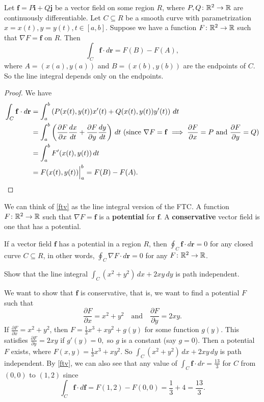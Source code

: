 \begin{theorem}\label{ftv}
    Let $\mathbf f=P\mathbf i+Q\mathbf j$ be a vector field on some region $R$, where $P,Q \colon \mathbb{R}^2 \to \mathbb{R}$ are continuously differentiable. Let $C\subseteq R$ be a smooth curve with parametrization $x=x(t),y=y(t),t\in [a,b]$. Suppose we have a function $F \colon \mathbb{R}^2 \to \mathbb{R}$ such that $\nabla F=\mathbf f$ on $R$. Then \[
        \int_{C}^{} \mathbf f \cdot d\mathbf r=F(B)-F(A),
    \] where $A=(x(a),y(a))$ and $B=(x(b),y(b))$ are the endpoints of $C$. So the line integral depends only on the endpoints.
\end{theorem}
\begin{proof}
We have 
\begin{align*}
    \int_{C}^{} \mathbf f\cdot d\mathbf r&=\int_{a}^{b} \left( P(x(t),y(t))x'(t)+Q(x(t),y(t))y'(t) \right)  \, dt\\
                                         &=\int_{a}^{b} \left( \frac{\partial F}{\partial x}\frac{dx}{dt}+\frac{\partial F}{\partial y}\frac{dy}{dt} \right)  \, dt \ \text{(since} \ \nabla F=\mathbf f \implies \frac{\partial F}{\partial x}=P \ \text{and} \ \frac{\partial F}{\partial y}=Q\text{)}\\
                                         &=\int_{a}^{b} F'(x(t),y(t)) \, dt\\
                                         &=\Big. F(x(t),y(t)) \Big|_a^b=F(B)-F(A).\qedhere
\end{align*}
\end{proof}
We can think of \cref{ftv} as the line integral version of the FTC. A function $F \colon \mathbb{R}^2 \to \mathbb{R}$ such that $\nabla F= \mathbf f$ is a \textbf{potential} for $\mathbf f$. A \textbf{conservative} vector field is one that has a potential.
\begin{cor}
    If a vector field $\mathbf f$ has a potential in a region $R$, then $\oint_{C}^{}  \mathbf f\cdot d\mathbf r=0$ for any closed curve $C\subseteq R$, in other words, $\oint_{C}^{} \nabla F  \cdot  d\mathbf r=0$ for any $F \colon \mathbb{R}^2 \to \mathbb{R}$.
\end{cor}
\begin{example}
    Show that the line integral $\int_{C}^{} (x^2+y^2) \, dx+2xy \, dy$ is path independent.
\end{example}
\begin{solution}
    We want to show that $\mathbf f$ is conservative, that is, we want to find a potential $F$ such that \[
    \frac{\partial F}{\partial x}=x^2+y^2 \quad \text{and} \quad \frac{\partial F}{\partial y}=2xy.
    \] 
    If $\frac{\partial F}{\partial x}=x^2+y^2$, then $F=\frac{1}{3}x^3+xy^2+g(y)$ for some function $g(y)$. This satisfies $\frac{\partial F}{\partial y}=2xy$ if $g'(y)=0,$ so $g$ is a constant (say $g=0$). Then a potential $F$ exists, where $F(x,y)=\frac{1}{3}x^3+xy^2$. So $\int_{C}^{} (x^2+y^2) \, dx+2xy \, dy$ is path independent. By \cref{ftv}, we can also see that any value of $\int_{C}^{} \mathbf f \cdot  dr=\frac{13}{3}$ for $C$ from $(0,0)$ to $(1,2)$ since \[
        \int_{C}^{} \mathbf f \cdot d\mathbf f=F(1,2)-F(0,0)=\frac{1}{3}+4=\frac{13}{3}.
    \] 
\end{solution}

